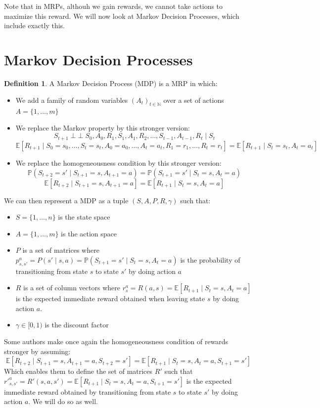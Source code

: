 \documentclass{article}
\theoremstyle{definition}
\newtheorem{definition}{Definition}[section]
\theoremstyle{remark}
\theoremstyle{example}
\DeclareMathOperator{\ind}{\perp \!\!\! \perp}
\begin{document}
Note that in MRPs, althouh we gain rewards, we cannot take actions to maximize this reward. We will now look at Markov Decision Processes, which include exactly this.

\section{Markov Decision Processes}

\begin{definition}
		A Markov Decision Process (MDP) is a MRP in which:
		\begin{itemize}
				\item We add a family of random variables $(A_t)_{t \in \mathbb{N}}$ over a set of actions $A = \{1, \dots, m\}$
				\item We replace the Markov property by this stronger version:
						$$S_{t+1} \ind S_0, A_0, R_1, S_1, A_1, R_2, \dots, S_{t-1}, A_{t-1}, R_t \mid S_t$$
						$$\mathbb{E}[R_{t+1} \mid S_0 = s_0, \dots, S_t = s_t, A_0 = a_0, \dots, A_t = a_t, R_1 = r_1, \dots, R_t = r_t] = \mathbb{E}[R_{t+1} \mid S_t = s_t, A_t = a_t]$$
				\item We replace the homogeneousness condition by this stronger version:
						$$\mathbb{P}(S_{t+2} = s' \mid S_{t+1} = s, A_{t+1} = a) = \mathbb{P}(S_{t+1} = s' \mid S_t = s, A_t = a)$$
						$$\mathbb{E}[R_{t+2} \mid S_{t+1} = s, A_{t+1} = a] = \mathbb{E}[R_{t+1} \mid S_t = s, A_t = a]$$
		\end{itemize}
		We can then represent a MDP as a tuple $(S, A, P, R, \gamma)$ such that:
		\begin{itemize}
				\item $S = \{1, \dots, n\}$ is the state space
				\item $A = \{1, \dots, m\}$ is the action space
				\item $P$ is a set of matrices where $p^a_{s,s'} = P(s' \mid s, a) = \mathbb{P}(S_{t+1} = s' \mid S_t = s, A_t = a)$ is the probability of transitioning from state $s$ to state $s'$ by doing action $a$
				\item $R$ is a set of column vectors where $r^a_s = R(a, s) = \mathbb{E}[R_{t+1} \mid S_t = s, A_t = a]$ is the expected immediate reward obtained when leaving state $s$ by doing action $a$.
				\item $\gamma \in [0, 1)$ is the discount factor
		\end{itemize}
		Some authors make once again the homogeneousness condition of rewards stronger by assuming:
				$$\mathbb{E}[R_{t+2} \mid S_{t+1} = s, A_{t+1} = a, S_{t+2} = s'] = \mathbb{E}[R_{t+1} \mid S_t = s, A_t = a, S_{t+1} = s']$$
				Which enables them to define the set of matrices $R'$ such that $r'^a_{s,s'} = R'(s, a, s') = \mathbb{E}[R_{t+1} \mid S_t = s, A_t = a, S_{t+1} = s']$ is the expected immediate reward obtained by transitioning from state $s$ to state $s'$ by doing action $a$. We will do so as well.
\end{definition}
\end{document}
